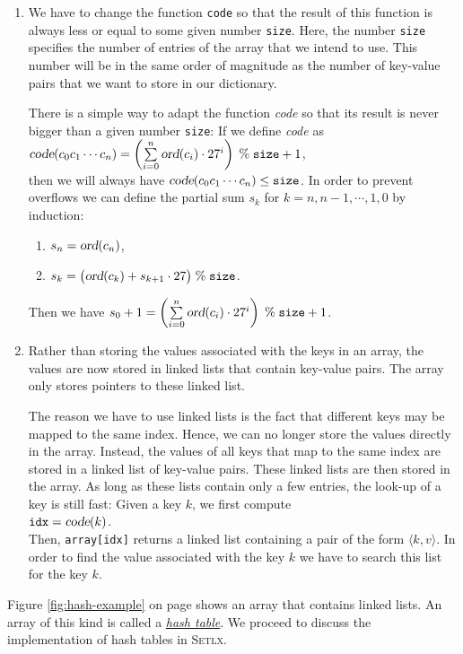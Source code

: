 \begin{enumerate}
\item We have to change the function  \texttt{code} so that the result of this function is always
      less or equal to some given number \texttt{size}.  Here, the number \texttt{size} specifies
      the number of entries of the array that we intend to use.  This number will be in the same
      order of magnitude as the number of key-value pairs that we want to store in our dictionary.

      There is a simple way to adapt the function  \textsl{code} so that its result is never bigger
      than a given number \texttt{size}: If we define \textsl{code} as
      \\[0.2cm]
      \hspace*{1.3cm} 
      $\textsl{code}(c_0c_1\cdots c_n) = \left(\sum\limits_{i=0}^n \textsl{ord}(c_i) \cdot
        27^i\right) \;\%\; \texttt{size} + 1$,
      \\[0.2cm]
      then we will always have $\textsl{code}(c_0c_1\cdots c_n) \leq \mathtt{size}$.  In order to
      prevent overflows we can define the partial sum $s_k$ for  $k=n,n-1,\cdots,1,0$ by induction:
      \begin{enumerate}
      \item $s_n = \textsl{ord}(c_n)$,
      \item $s_{k} = \bigl(\textsl{ord}(c_{k}) + s_{k+1} \cdot 27 \bigr) \;\%\; \texttt{size}$.
      \end{enumerate}
      Then we have
      \hspace*{1.3cm} 
      $s_0 + 1 = \left(\sum\limits_{i=0}^n \textsl{ord}(c_i) \cdot 27^i\right) \;\%\; \texttt{size} + 1$.
\item Rather than storing the values associated with the keys in an array, the values are now stored
      in linked lists that contain key-value pairs.  The array only stores pointers to these linked list.
      
      The reason we have to use linked lists is the fact that different keys may be mapped to the
      same index.  Hence, we can no longer store the values directly in the array.  Instead,
      the values of all keys that map to the same index are stored in a
      linked list of key-value pairs.  These linked lists are then stored in the array.  As long as
      these lists contain only a few entries, the look-up of a key is still fast: Given a key $k$,
      we first compute 
      \\[0.2cm]
      \hspace*{1.3cm}
      $\mathtt{idx} = \textsl{code}(k)$.
      \\[0.2cm]
      Then, \texttt{array[idx]} returns a linked list containing a pair of the form $\langle k, v \rangle$.
      In order to find the value associated with the key $k$ we have to search this list for the key
      $k$.
\end{enumerate}
Figure \ref{fig:hash-example} on page \pageref{fig:hash-example} shows an array that contains
linked lists.  An array of this kind is called a
\href{https://en.wikipedia.org/wiki/Hash_table}{\emph{hash table}}.
We proceed to discuss the implementation of hash tables in \textsc{Setlx}.



